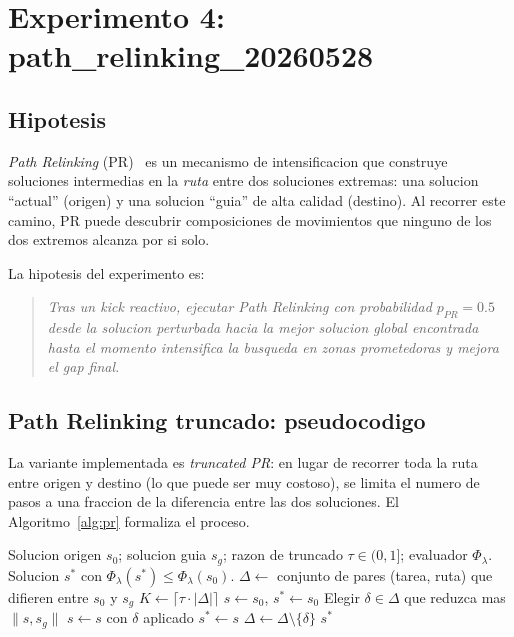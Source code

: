 \section{Experimento 4: path\_relinking\_20260528}
\label{sec:exp-pr}

\subsection{Hipotesis}

\emph{Path Relinking} (PR)~\cite{glover2000} es un mecanismo de intensificacion que
construye soluciones intermedias en la \emph{ruta} entre dos
soluciones extremas: una solucion ``actual'' (origen) y una solucion
``guia'' de alta calidad (destino). Al recorrer este camino, PR puede
descubrir composiciones de movimientos que ninguno de los dos extremos
alcanza por si solo.

La hipotesis del experimento es:

\begin{quote}
\textit{Tras un kick reactivo, ejecutar Path Relinking con probabilidad
$p_{PR} = 0.5$ desde la solucion perturbada hacia la mejor solucion
global encontrada hasta el momento intensifica la busqueda en zonas
prometedoras y mejora el gap final.}
\end{quote}

\subsection{Path Relinking truncado: pseudocodigo}

La variante implementada es \emph{truncated PR}: en lugar de recorrer
toda la ruta entre origen y destino (lo que puede ser muy costoso), se
limita el numero de pasos a una fraccion de la diferencia entre las
dos soluciones. El Algoritmo~\ref{alg:pr} formaliza el proceso.

\begin{algorithm}[h]
\caption{Path Relinking truncado (capa 3).}
\label{alg:pr}
\begin{algorithmic}[1]
\Require Solucion origen $s_0$; solucion guia $s_g$; razon de truncado
  $\tau \in (0,1]$; evaluador $\Phi_\lambda$.
\Ensure Solucion $s^*$ con $\Phi_\lambda(s^*) \le \Phi_\lambda(s_0)$.
\State $\Delta \gets$ conjunto de pares (tarea, ruta) que difieren entre $s_0$ y $s_g$
\State $K \gets \lceil \tau \cdot |\Delta| \rceil$
\State $s \gets s_0$, $s^* \gets s_0$
  \State Elegir $\delta \in \Delta$ que reduzca mas $\|s, s_g\|$
  \State $s \gets s$ con $\delta$ aplicado
    \State $s^* \gets s$
  \EndIf
  \State $\Delta \gets \Delta \setminus \{\delta\}$
\EndFor
\State \Return $s^*$
\end{algorithmic}
\end{algorithm}

